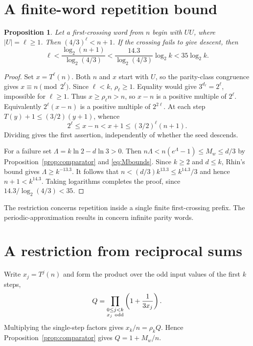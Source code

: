 \documentclass[11pt,a4paper]{article}
\theoremstyle{plain}\newtheorem{theorem}{Theorem}\newtheorem{proposition}[theorem]{Proposition}
\theoremstyle{definition}\newtheorem{example}[theorem]{Example}
\theoremstyle{remark}\newtheorem{remark}[theorem]{Remark}
\begin{document}
\section{A finite-word repetition bound}
\begin{proposition}\label{prop:square}
Let a first-crossing word from $n$ begin with $UU$, where $|U|=\ell\ge1$.
Then $(4/3)^\ell<n+1$. If the crossing fails to give descent, then
\[
 \ell<\frac{\log_2(n+1)}{\log_2(4/3)}
      <\frac{14.3}{\log_2(4/3)}\log_2 k<35\log_2 k .
\]
\end{proposition}
\begin{proof}
Set $x=T^\ell(n)$. Both $n$ and $x$ start with $U$, so the parity-class congruence gives
$x\equiv n\pmod{2^\ell}$. Since $\ell<k$, $\rho_\ell\ge1$.
Equality would give $3^{d_\ell}=2^\ell$, impossible for $\ell\ge1$.
Thus $x\ge\rho_\ell n>n$, so $x-n$ is a positive multiple of $2^\ell$.
Equivalently $2^\ell(x-n)$ is a positive multiple of $2^{2\ell}$.
At each step $T(y)+1\le(3/2)(y+1)$, whence
\[
 2^\ell\le x-n<x+1\le(3/2)^\ell(n+1).
\]
Dividing gives the first assertion, independently of whether the seed descends.

For a failure set $\Lambda=k\ln2-d\ln3>0$. Then
$n\Lambda<n(e^\Lambda-1)\le M_w\le d/3$ by Proposition~\ref{prop:comparator}
and \eqref{eq:Mbounds}. Since $k\ge2$ and $d\le k$, Rhin's bound
\cite[Prop.~6.3]{rozier2026} gives $\Lambda\ge k^{-13.3}$. It follows that
$n<(d/3)k^{13.3}\le k^{14.3}/3$ and hence $n+1<k^{14.3}$.
Taking logarithms completes the proof, since $14.3/\log_2(4/3)<35$.
\end{proof}
The restriction concerns repetition inside a single finite first-crossing prefix.
The periodic-approximation results in \cite{dj-sturmian2026} concern infinite parity words.

\section{A restriction from reciprocal sums}
Write $x_j=T^j(n)$ and form the product over the odd input values of the first $k$ steps,
\[
 Q=\prod_{\substack{0\le j<k\\x_j\ {\rm odd}}}\left(1+\frac{1}{3x_j}\right).
\]
Multiplying the single-step factors gives $x_k/n=\rho_k Q$. Hence
Proposition~\ref{prop:comparator} gives $Q=1+M_w/n$.
\end{document}
